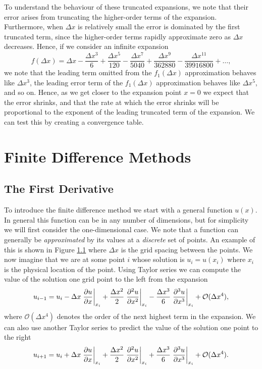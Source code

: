 To understand the behaviour of these truncated expansions, we note that their error arises from truncating the higher-order terms of the expansion. Furthermore, when $\Delta x$ is relatively small the error is dominated by the first truncated term, since the higher-order terms rapidly approximate zero as $\Delta x$ decreases. Hence, if we consider an infinite expansion
\begin{equation}
	f(\Delta x) = \Delta x - \frac{\Delta x^3}{6} + \frac{\Delta x^5}{120} - \frac{\Delta x^7}{5040} + \frac{\Delta x^9}{362880} - \frac{\Delta x^{11}}{39916800} + \hdots,
\end{equation}
we note that the leading term omitted from the $f_1(\Delta x)$ approximation behaves like $\Delta x^3$, the leading error term of the $f_1(\Delta x)$ approximation behaves like $\Delta x^5$, and so on. Hence, as we get closer to the expansion point $x=0$ we expect that the error shrinks, and that the rate at which the error shrinks will be proportional to the exponent of the leading truncated term of the expansion. We can test this by creating a convergence table.
	
\chapter{Finite Difference Methods}
\section{The First Derivative}
To introduce the finite difference method we start with a general function $u(x)$. In general this function can be in any number of dimensions, but for simplicity we will first consider the one-dimensional case. We note that a function can generally be {\it approximated} by its values at a {\it discrete} set of points. An example of this is shown in Figure \ref{} where $\Delta x$ is the grid spacing between the points. We now imagine that we are at some point $i$ whose solution is $u_i = u(x_i)$ where $x_i$ is the physical location of the point. Using Taylor series we can compute the value of the solution one grid point to the left from the expansion
\begin{equation}
	u_{i-1} = u_i - \Delta x \left.\frac{\partial u}{\partial x}\right\rvert_{x_i}^{} + \frac{\Delta x^2}{2} \left.\frac{\partial^2 u}{\partial x^2}\right\rvert_{x_i}^{} - \frac{\Delta x^3}{6} \left.\frac{\partial^3 u}{\partial x^3}\right\rvert_{x_i}^{} + \mathcal{O}(\Delta x^4),
	\label{eqn:fdmup}
\end{equation}
where $\mathcal{O}(\Delta x^4)$ denotes the order of the next highest term in the expansion. We can also use another Taylor series to predict the value of the solution one point to the right
\begin{equation}
	u_{i+1} = u_i + \Delta x \left.\frac{\partial u}{\partial x}\right\rvert_{x_i}^{} + \frac{\Delta x^2}{2} \left.\frac{\partial^2 u}{\partial x^2}\right\rvert_{x_i}^{} + \frac{\Delta x^3}{6} \left.\frac{\partial^3 u}{\partial x^3}\right\rvert_{x_i}^{} + \mathcal{O}(\Delta x^4).
	\label{eqn:fdmdwn}
\end{equation}

